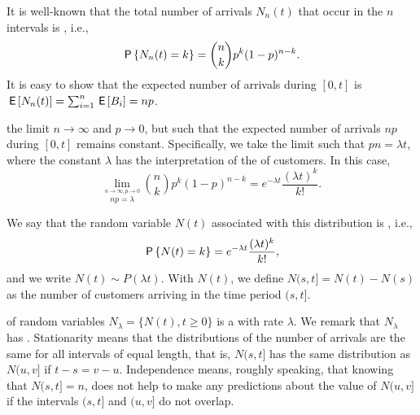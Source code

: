 
It is well-known that the total number of arrivals $N_n(t)$ that occur in the $n$ intervals is , i.e.,
\begin{equation*}
 \P{N_n(t) = k} = {n \choose k} p^k (1-p)^{n-k}.
\end{equation*}
It is easy to show that  the expected number of arrivals during $[0,t]$ is
$  \E{N_n(t)} = \sum_{i=1}^n \E{B_i} = n p$.



 the limit $n\to\infty$ and $p\to0$, but such that the expected number of arrivals $n p$ during $[0,t]$ remains constant.
Specifically, we take the limit such that $p n =\lambda t$, where the constant $\lambda$ has the interpretation of the  of  customers.
In this case,
\begin{equation}\label{eq:bin}
  \lim_{\stackrel{n\to\infty, p\to 0}{np=\lambda}}{n \choose k} p^k (1-p)^{n-k} = e^{-\lambda t}\frac{(\lambda t)^k}{k!}.
\end{equation}


We say that the random variable $N(t)$
associated with this distribution is , i.e.,
\begin{equation*}
 \P{N(t) = k} =
e^{-\lambda t} \frac{(\lambda t)^k}{k!},
\end{equation*}
and we write $N(t)\sim P(\lambda t)$.
With $N(t)$, we define $N(s, t] = N(t)-N(s)$ as the number of customers arriving in the time period $(s, t]$.\sidenote{Note that $[0,t]$ is closed at both ends, but $(s,t]$ is open at the left.}



 of random variables $N_\lambda=\{N(t), t\geq 0\}$ is a  with rate $\lambda$.
We remark that  $N_\lambda$ has .
Stationarity means that the distributions of the number of arrivals are the same for all intervals of equal length, that is,
$N(s,t]$ has the same distribution as $N(u, v]$ if $t-s = v-u$.
Independence means, roughly speaking, that knowing that $N(s,t]= n$, does not help to make any predictions about the value of $N(u, v]$ if the intervals $(s,t]$ and $(u, v]$ do not overlap.

